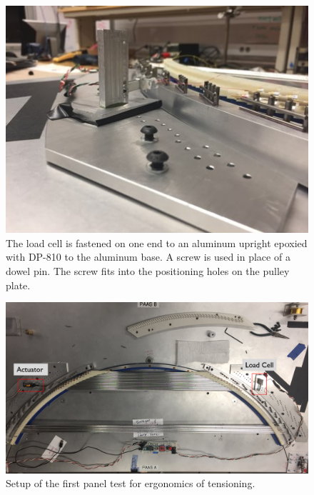 \documentclass[letterpaper,12pt]{article}
\begin{document}
\begin{figure} [h]
		\centering
		\includegraphics[width=1\textwidth,angle=0]{load_cell_mount.jpg}
		\caption{The load cell is fastened on one end to an aluminum upright epoxied with DP-810 to the aluminum base. A screw is used in place of a dowel pin. The screw fits into the positioning holes on the pulley plate.}
		\label{fig:load}
\end{figure}

\begin{figure} [h]
		\centering
		\includegraphics[width=1\textwidth,angle=0]{full_test_1.png}
		\caption{Setup of the first panel test for ergonomics of tensioning.}
		\label{fig:panel}
\end{figure}
\end{document}
